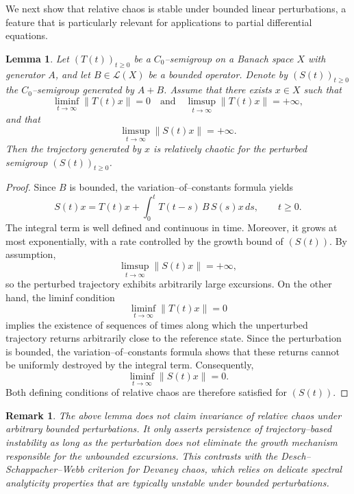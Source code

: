 \documentclass[12pt]{article}
\newtheorem{lemma}[theorem]{Lemma}
\newtheorem{remark}[theorem]{Remark}
\begin{document}
We next show that relative chaos is stable under bounded linear perturbations, a feature that is particularly relevant for applications to partial differential equations.

\begin{lemma}\label{lem:boundedpert}
Let $(T(t))_{t\ge 0}$ be a $C_0$--semigroup on a Banach space $X$ with generator $A$, and let $B\in\mathcal{L}(X)$ be a bounded operator. Denote by $(S(t))_{t\ge 0}$ the $C_0$--semigroup generated by $A+B$. Assume that there exists $x\in X$ such that
\[
\liminf_{t\to\infty}\|T(t)x\|=0
\quad\text{and}\quad
\limsup_{t\to\infty}\|T(t)x\|=+\infty,
\]
and that
\[
\limsup_{t\to\infty}\|S(t)x\|=+\infty.
\]
Then the trajectory generated by $x$ is relatively chaotic for the perturbed semigroup $(S(t))_{t\ge 0}$.
\end{lemma}


\begin{proof}
Since $B$ is bounded, the variation--of--constants formula yields
\[
S(t)x
=
T(t)x
+
\int_0^t T(t-s)\,B\,S(s)x\,ds,
\qquad t\ge 0.
\]
The integral term is well defined and continuous in time. Moreover, it grows at most exponentially, with a rate controlled by the growth bound of $(S(t))$. By assumption,
\[
\limsup_{t\to\infty}\|S(t)x\|=+\infty,
\]
so the perturbed trajectory exhibits arbitrarily large excursions.
On the other hand, the liminf condition
\[
\liminf_{t\to\infty}\|T(t)x\|=0
\]
implies the existence of sequences of times along which the
unperturbed trajectory returns arbitrarily close to the reference state. Since the perturbation is bounded, the variation--of--constants formula shows that these returns cannot be uniformly
destroyed by the integral term. Consequently,
\[
\liminf_{t\to\infty}\|S(t)x\|=0.
\]
Both defining conditions of relative chaos are therefore satisfied for $(S(t))$.
\end{proof}

\begin{remark}
The above lemma does not claim invariance of relative chaos under arbitrary bounded perturbations. It only asserts persistence of trajectory--based instability as long as the perturbation does not eliminate the growth mechanism responsible for the unbounded excursions. This contrasts with the Desch--Schappacher--Webb criterion for Devaney chaos, which relies on delicate spectral analyticity properties that are typically unstable under bounded perturbations.
\end{remark}
\end{document}
